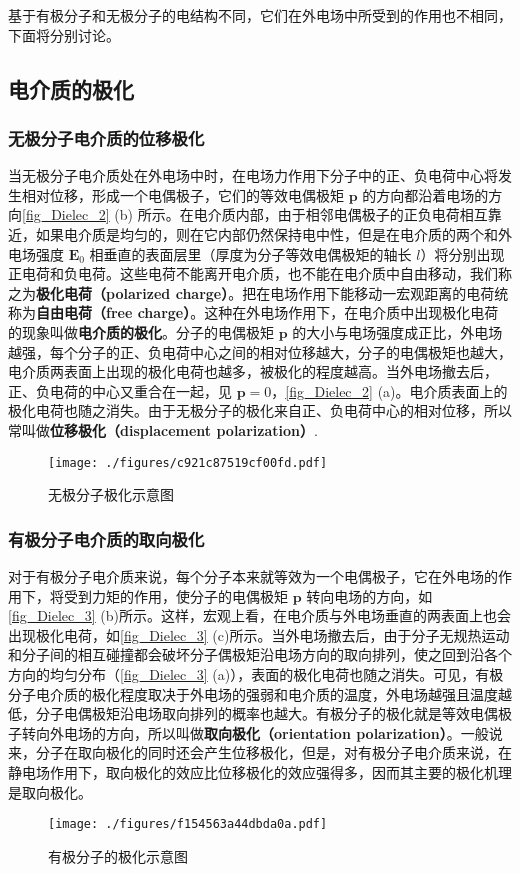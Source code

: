 基于有极分子和无极分子的电结构不同，它们在外电场中所受到的作用也不相同，下面将分别讨论。

\subsection{电介质的极化}

\subsubsection{无极分子电介质的位移极化}

当无极分子电介质处在外电场中时，在电场力作用下分子中的正、负电荷中心将发生相对位移，形成一个电偶极子，它们的等效电偶极矩 $\mathbf p$ 的方向都沿着电场的方向\autoref{fig_Dielec_2} (b) 所示。在电介质内部，由于相邻电偶极子的正负电荷相互靠近，如果电介质是均匀的，则在它内部仍然保持电中性，但是在电介质的两个和外电场强度 $\mathbf E_0$ 相垂直的表面层里（厚度为分子等效电偶极矩的轴长 $l$）将分别出现正电荷和负电荷。这些电荷不能离开电介质，也不能在电介质中自由移动，我们称之为\textbf{极化电荷（polarized charge）}。把在电场作用下能移动一宏观距离的电荷统称为\textbf{自由电荷（free charge）}。这种在外电场作用下，在电介质中出现极化电荷的现象叫做\textbf{电介质的极化}。分子的电偶极矩 $\mathbf p $ 的大小与电场强度成正比，外电场越强，每个分子的正、负电荷中心之间的相对位移越大，分子的电偶极矩也越大，电介质两表面上出现的极化电荷也越多，被极化的程度越高。当外电场撤去后，正、负电荷的中心又重合在一起，见 $\mathbf p=0$，\autoref{fig_Dielec_2} (a)。电介质表面上的极化电荷也随之消失。由于无极分子的极化来自正、负电荷中心的相对位移，所以常叫做\textbf{位移极化（displacement polarization）}.
\begin{figure}[ht]
\centering
\texttt{[image: ./figures/c921c87519cf00fd.pdf]}
\caption{无极分子极化示意图} \label{fig_Dielec_2}
\end{figure}

\subsubsection{有极分子电介质的取向极化}

对于有极分子电介质来说，每个分子本来就等效为一个电偶极子，它在外电场的作用下，将受到力矩的作用，使分子的电偶极矩 $\mathbf p$ 转向电场的方向，如\autoref{fig_Dielec_3} (b)所示。这样，宏观上看，在电介质与外电场垂直的两表面上也会出现极化电荷，如\autoref{fig_Dielec_3} (c)所示。当外电场撤去后，由于分子无规热运动和分子间的相互碰撞都会破坏分子偶极矩沿电场方向的取向排列，使之回到沿各个方向的均匀分布（\autoref{fig_Dielec_3} (a)），表面的极化电荷也随之消失。可见，有极分子电介质的极化程度取决于外电场的强弱和电介质的温度，外电场越强且温度越低，分子电偶极矩沿电场取向排列的概率也越大。有极分子的极化就是等效电偶极子转向外电场的方向，所以叫做\textbf{取向极化（orientation polarization）}。一般说来，分子在取向极化的同时还会产生位移极化，但是，对有极分子电介质来说，在静电场作用下，取向极化的效应比位移极化的效应强得多，因而其主要的极化机理是取向极化。
\begin{figure}[ht]
\centering
\texttt{[image: ./figures/f154563a44dbda0a.pdf]}
\caption{有极分子的极化示意图} \label{fig_Dielec_3}
\end{figure}

